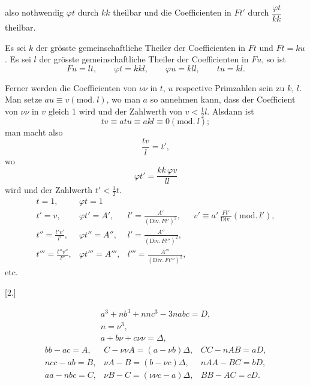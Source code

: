 \noindent also nothwendig $\varphi t$ durch $kk$ theilbar und die Coefficienten in $Ft'$ durch
$\dfrac{\varphi t}{kk}$ theilbar.

Es sei $k$ der grösste gemeinschaftliche Theiler der Coefficienten in $Ft$ und $Ft = ku$. Es sei
$l$ der grösste gemeinschaftliche Theiler der Coefficienten in $Fu$, so ist
\[
Fu = lt, \qquad \varphi t = kkl, \qquad \varphi u = kll, \qquad tu = kl.
\]

Ferner werden die Coefficienten von $\nu\nu$ in $t$, $u$ respective Primzahlen sein zu $k$, $l$.
Man setze $au \equiv v (\mathrm{mod.}\ l)$, wo man $a$ so annehmen kann, dass der Coefficient von $\nu\nu$
in $v$ gleich 1 wird und der Zahlwerth von $v < \tfrac{1}{2} l$. Alsdann ist
\[
tv \equiv atu \equiv akl \equiv 0 (\mathrm{mod.}\ l);
\]
\noindent man macht also
\[
\frac{tv}{l} = t',
\]
\noindent wo
\[
\varphi t' = \frac{kk\,\varphi v}{ll}
\]
\noindent wird und der Zahlwerth $t' < \tfrac{1}{2} t$.
\begingroup\small
\[
\begin{array}{llll}
t=1,& \varphi t = 1 & & \\
t'=v,& \varphi t' = A', & l' = \frac{A'}{(\mathrm{Div.}\,Ft')^2}, &
v' \equiv a'\,\frac{Ft'}{\mathrm{Div.}} (\mathrm{mod.}\ l'), \\
t''=\frac{t'v'}{l'}, & \varphi t'' = A'', & l' = \frac{A''}{(\mathrm{Div.}\,Ft'')^2}, & \\
t'''=\frac{t''v''}{l''}, & \varphi t''' = A''', & l''' = \frac{A'''}{(\mathrm{Div.}\,Ft''')^2}, &
\end{array}
\]
\endgroup
etc.

\begin{center}[2.]\end{center}
\[
\begin{gathered}
a^3+nb^3+nnc^3-3nabc = D, \\
n = \nu^3, \\
a+b\nu+c\nu\nu = \Delta,
\end{gathered}
\]
\[
\begin{array}{lll}
bb-ac = A, & C-\nu\nu A = (a-\nu b)\Delta, & CC-nAB = aD, \\
ncc-ab = B, & \nu A - B = (b-\nu c)\Delta, & nAA-BC = bD, \\
aa-nbc = C, & \nu B - C = (\nu\nu c - a)\Delta, & BB-AC = cD.
\end{array}
\]

